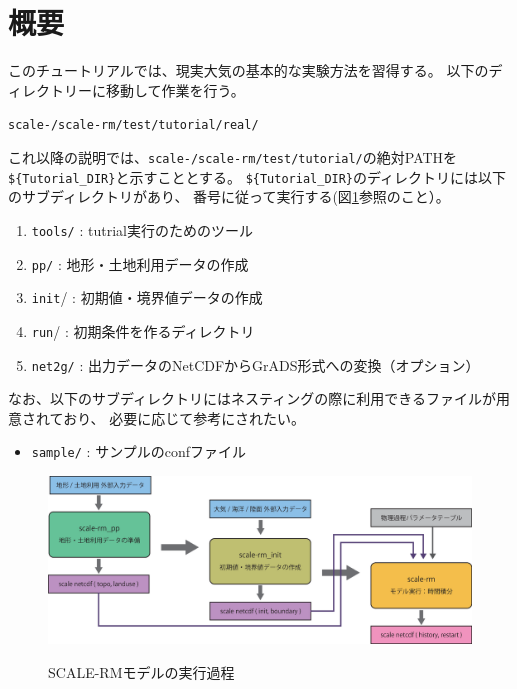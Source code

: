 \section{概要}
このチュートリアルでは、現実大気の基本的な実験方法を習得する。
以下のディレクトリーに移動して作業を行う。
\begin{alltt}
 scale-{\version}/scale-rm/test/tutorial/real/
\end{alltt}
これ以降の説明では、\texttt{scale-{\version}/scale-rm/test/tutorial/}の絶対PATHを
\verb|${Tutorial_DIR}|と示すこととする。
\verb|${Tutorial_DIR}|のディレクトリには以下のサブディレクトリがあり、
番号に従って実行する(図\ref{fig:howto}参照のこと）。
\begin{enumerate}
\item  \texttt{tools/}   : tutrial実行のためのツール
\item  \texttt{pp/}      : 地形・土地利用データの作成
\item  \texttt{init}/    : 初期値・境界値データの作成
\item  \texttt{run}/     : 初期条件を作るディレクトリ
\item  \texttt{net2g/}   : 出力データのNetCDFからGrADS形式への変換（オプション） 
\end{enumerate}
なお、以下のサブディレクトリにはネスティングの際に利用できるファイルが用意されており、
必要に応じて参考にされたい。
\begin{itemize}
\item  \texttt{sample/}  : サンプルのconfファイル
\end{itemize}


\begin{figure}[b]
\begin{center}
  \includegraphics[width=0.9\hsize]{./figure/real_procedure.eps}\\
  \caption{SCALE-RMモデルの実行過程}
  \label{fig:howto}
\end{center}
\end{figure}

